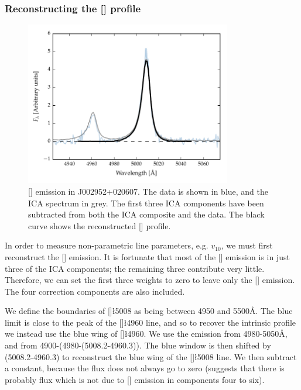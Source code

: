 \subsubsection{Reconstructing the [] profile}

\begin{figure}
    \centering
    \includegraphics[width=0.8\textwidth]{figures/chapter04/oiii_reconstruction.pdf} 
    \caption[{[] emission in J002952+020607.}]{[] emission in J002952+020607. The data is shown in blue, and the \ac{ICA} spectrum in grey. The first three \ac{ICA} components have been subtracted from both the \ac{ICA} composite and the data. The black curve shows the reconstructed [] profile.}     
    \label{fig:oiii_reconstruction}
\end{figure}

In order to measure non-parametric line parameters, e.g. $v_{10}$, we must first reconstruct the [] emission. 
It is fortunate that most of the [] emission is in just three of the \ac{ICA} components; the remaining three contribute very little. 
Therefore, we can set the first three weights to zero to leave only the [] emission. 
The four correction components are also included. 

We define the boundaries of []\l5008 as being between 4950 and 5500\AA. 
The blue limit is close to the peak of the []\l4960 line, and so to recover the intrinsic profile we instead use the blue wing of []\l4960. 
We use the emission from 4980-5050\AA, and from 4900-(4980-(5008.2-4960.3)). 
The blue window is then shifted by (5008.2-4960.3) to reconstruct the blue wing of the []\l5008 line. 
We then subtract a constant, because the flux does not always go to zero (suggests that there is probably flux which is not due to [] emission in components four to six). 

